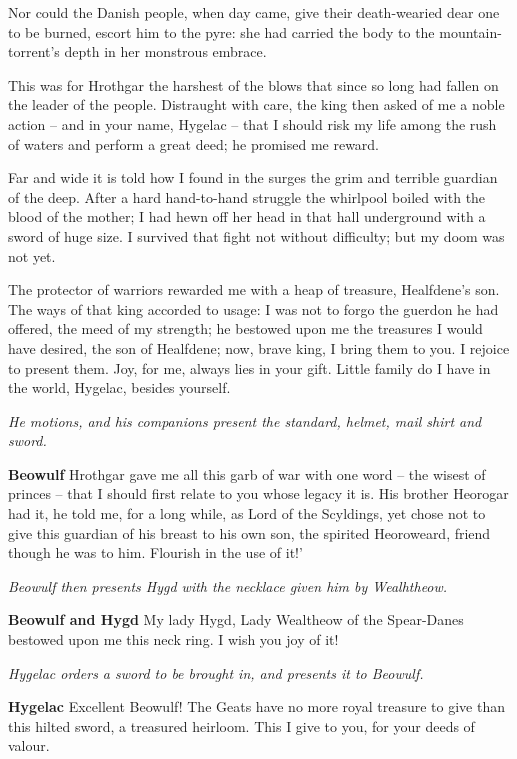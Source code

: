 \documentclass[a4paper]{article}
\begin{document}
{Nor could the Danish people, when day came,
give their death-wearied dear one to be burned,
escort him to the pyre: she had carried the body
to the mountain-torrent’s depth in her monstrous embrace.

This was for Hrothgar the harshest of the blows
that since so long had fallen on the leader of the people.
Distraught with care, the king then asked of me
a noble action – and in your name, Hygelac –
that I should risk my life among the rush of waters
and perform a great deed; he promised me reward.

Far and wide it is told how I found in the surges
the grim and terrible guardian of the deep.
After a hard hand-to-hand struggle
the whirlpool boiled with the blood of the mother;
I had hewn off her head in that hall underground
with a sword of huge size. I survived that fight
not without difficulty; but my doom was not yet.

The protector of warriors rewarded me
with a heap of treasure, Healfdene’s son.
The ways of that king accorded to usage:
I was not to forgo the guerdon he had offered,
the meed of my strength; he bestowed upon me
the treasures I would have desired, the son of Healfdene;
now, brave king, I bring them to you.
I rejoice to present them. Joy, for me, always
lies in your gift. Little family
do I have in the world, Hygelac, besides yourself.

\centerline{\textit{He motions, and his companions present the standard, helmet, mail shirt and sword.}}

\textbf{Beowulf} Hrothgar gave me all this garb of war
with one word – the wisest of princes –
that I should first relate to you whose legacy it is.
His brother Heorogar had it, he told me,
for a long while, as Lord of the Scyldings,
yet chose not to give this guardian of his breast
to his own son, the spirited Heoroweard,
friend though he was to him.
Flourish in the use of it!’

\centerline{\textit{Beowulf then presents Hygd with the necklace given him by Wealhtheow.}}

\textbf{Beowulf and Hygd} My lady Hygd,
Lady Wealtheow of the Spear-Danes 
bestowed upon me this neck ring. 
I wish you joy of it!

\centerline{\textit{Hygelac orders a sword to be brought in, and presents it to Beowulf.}}

\textbf{Hygelac} Excellent Beowulf!
The Geats have no more royal treasure to give
than this hilted sword, a treasured heirloom.
This I give to you, for your deeds of valour.

}
\end{document}
